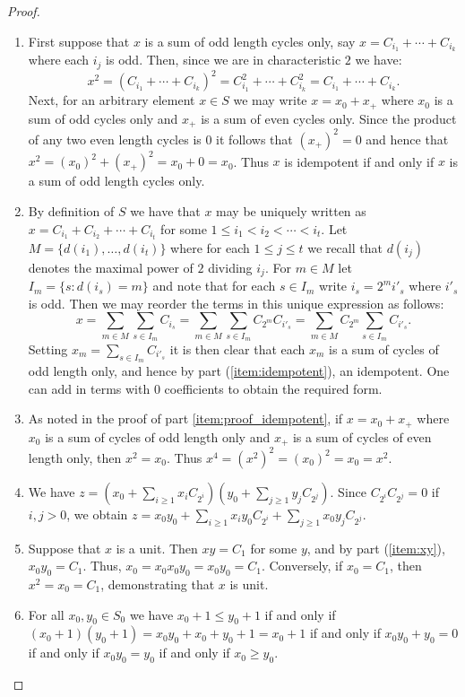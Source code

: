 \documentclass[a4paper, 11pt]{article}
\theoremstyle{plain}
\theoremstyle{definition}
\begin{document}
\begin{proof}
\begin{enumerate}
    \item \label{item:proof_idempotent}
First suppose that $x$ is a sum of odd length cycles only, say $x = C_{i_1} + \cdots + C_{i_k}$ where each $i_j$ is odd. Then, since we are in characteristic $2$ we have: 
$$x^2 = (C_{i_1} + \cdots + C_{i_k})^2 = C_{i_1}^2 + \cdots + C_{i_k}^2 = C_{i_1} + \cdots + C_{i_k}.$$
Next, for an arbitrary element $x \in S$ we may write $x = x_0 + x_+$ where $x_0$ is a sum of odd cycles only and $x_+$ is a sum of even cycles only. Since the product of any two even length cycles is 0 it follows that $(x_+)^2=0$ and hence that $x^2 = (x_0)^2 + (x_+)^2 = x_0 + 0 = x_0$. Thus $x$ is idempotent if and only if $x$ is a sum of odd length cycles only.

    \item \label{item:proof_decomposition}
By definition of $S$ we have that $x$ may be uniquely written as $x = C_{i_1} + C_{i_2} + \cdots + C_{i_t}$  for some $1 \leq i_1 < i_2 < \cdots <i_t$. Let $M = \{d(i_1), \ldots, d(i_t)\}$ where for each $1 \leq j \leq t$ we recall that $d(i_j)$ denotes the maximal power of $2$ dividing $i_j$. For $m \in M$ let $I_m = \{s: d(i_s)=m\}$ and note that for each $s \in I_m$ write $i_s=2^mi'_s$ where $i'_s$ is odd. Then we may reorder the terms in this unique expression as follows:  
$$x = \sum_{m \in M} \sum_{s \in I_m} C_{i_s} = \sum_{m \in M} \sum_{s \in I_m} C_{2^m}C_{i'_s}= \sum_{m \in M} C_{2^m}\sum_{s \in I_m} C_{i'_s}.$$
Setting $x_m = \sum_{s \in I_m} C_{i'_s}$ it is then clear that each $x_m$ is a sum of cycles of odd length only, and hence by part (\ref{item:idempotent}), an idempotent. One can add in terms with $0$ coefficients to obtain the required form.

    \item \label{item:proof_x4=x2}
As noted in the proof of part \ref{item:proof_idempotent}, if $x = x_0 + x_+$ where $x_0$ is a sum of cycles of odd length only and $x_+$ is a sum of cycles of even length only, then $x^2 = x_0$. Thus $x^4 = (x^2)^2 = (x_0)^2 = x_0 = x^2$.

    \item \label{item:proof_xy}
We have $z = ( x_0 + \sum_{i \ge 1} x_i C_{2^i} ) ( y_0 + \sum_{j \ge 1} y_j C_{2^j} ) $. Since $C_{2^i} C_{2^j} = 0$ if $i,j > 0$, we obtain $z = x_0 y_0 + \sum_{i \ge 1} x_i y_0 C_{2^i} + \sum_{j \ge 1} x_0 y_j C_{2^j}$. 

    \item \label{item:proof_unit}
Suppose that $x$ is a unit. Then $xy = C_1$ for some $y$, and by part (\ref{item:xy}), $x_0y_0 = C_1$. Thus, $x_0 = x_0 x_0 y_0 = x_0 y_0 = C_1$. Conversely, if $x_0 = C_1$, then $x^2 = x_0 = C_1$, demonstrating that $x$ is unit.

\item For all $x_0, y_0 \in S_0$ we have $x_0 + 1 \leq y_0 +1$ if and only if $(x_0+1)(y_0+1) = x_0y_0 + x_0 + y_0 +1 = x_0 + 1$ if and only if $x_0y_0 + y_0 = 0$ if and only if $x_0y_0 = y_0$ if and only if $x_0 \geq y_0$.
\end{enumerate}

\end{proof}
\end{document}
